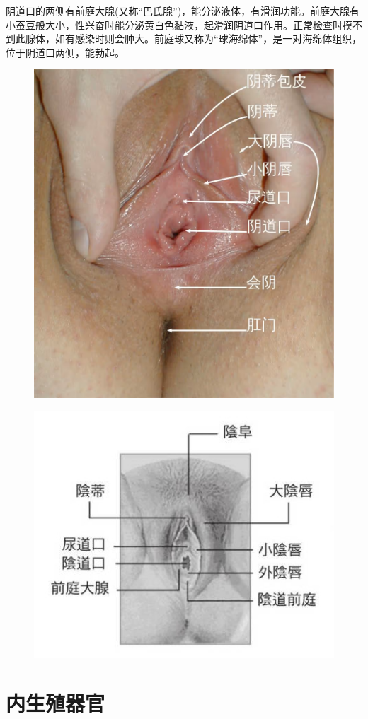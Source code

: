 \documentclass[12pt,UTF8]{ctexbook}
\begin{document}
阴道口的两侧有前庭大腺(又称“巴氏腺”)，能分泌液体，有滑润功能。前庭大腺有小蚕豆般大小，性兴奋时能分泌黄白色黏液，起滑润阴道口作用。正常检查时摸不到此腺体，如有感染时则会肿大。前庭球又称为“球海绵体”，是一对海绵体组织，位于阴道口两侧，能勃起。

\begin{figure}[htbp]
	\centering
	\includegraphics[width=0.7\linewidth]{1}
	\caption{}
	\label{fig:1}
\end{figure}

\begin{figure}[htbp]
	\centering
	\includegraphics[width=0.7\linewidth]{2}
	\caption{}
	\label{fig:1}
\end{figure}

\section{内生殖器官}
\end{document}
